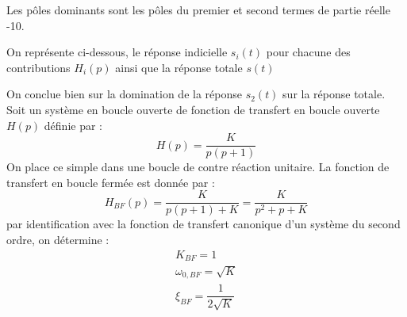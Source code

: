 Les pôles dominants sont les pôles du premier et second termes de partie 
réelle -10.
\begin{center}
    
\end{center}
On représente ci-dessous,
le réponse indicielle $s_i(t)$ pour chacune des contributions
$H_i(p)$ ainsi que la réponse totale $s(t)$
\begin{center}
    
\end{center}
On conclue bien sur la domination de la réponse $s_2(t)$ sur la réponse totale.
\clearpage
Soit un système en boucle ouverte de fonction de transfert en 
boucle ouverte $H(p)$ définie  par :
\[
H(p)=\dfrac{K}{p(p+1)}
\]
On place ce simple dans une boucle de contre réaction unitaire.
La fonction de transfert en boucle fermée est donnée par :
\[
H_{BF}(p)=\dfrac{K}{p(p+1)+K}=\dfrac{K}{p^2+p+K}
\]
par identification avec la fonction de transfert canonique d'un système 
du second ordre, on détermine :
\begin{align*}
K_{BF}=1\\
\omega_{0,BF}=\sqrt{K}\\
\xi_{BF}=\dfrac{1}{2\sqrt{K}}\\
\end{align*}
